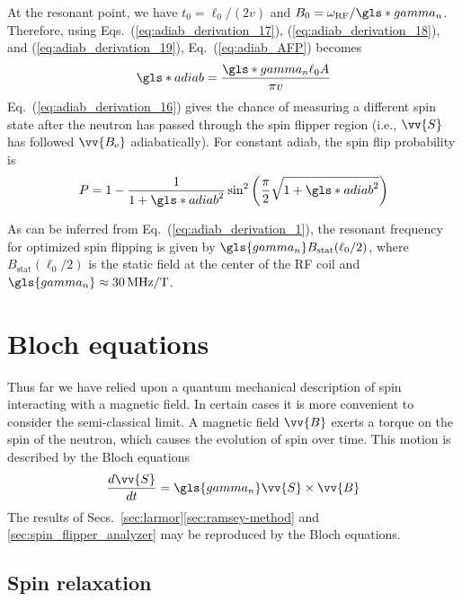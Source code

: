 %
At the resonant point, we have $t_0=\ell_0/(2v)$ and $B_0=\omega_\text{RF}/\gls*{gamma_n}$. Therefore, using Eqs.~(\ref{eq:adiab_derivation_17}), (\ref{eq:adiab_derivation_18}), and (\ref{eq:adiab_derivation_19}), Eq.~(\ref{eq:adiab_AFP}) becomes
%
\begin{gather}
    \gls*{adiab} = \frac{\gls*{gamma_n} \ell_0 A}{\pi v}
\end{gather}
%
Eq.~(\ref{eq:adiab_derivation_16}) gives the chance of measuring a different spin state after the neutron has passed through the spin flipper region (i.e., $\vv{S}$ has followed $\vv{B_\text{e}}$ adiabatically). For constant \gls*{adiab}, the spin flip probability is
%
\begin{gather}
    P=1-\frac{1}{1+\gls*{adiab}^{2}}\sin^{2}\left(\frac{\pi}{2}\sqrt{1+\gls*{adiab}^{2}}\right)
\end{gather}

As can be inferred from Eq.~(\ref{eq:adiab_derivation_1}), the resonant frequency for optimized spin flipping is given by $\gls{gamma_n} B_\text{stat}(\ell_0/2)$, where $B_\text{stat}(\ell_0/2)$ is the static field at the center of the RF coil and $\gls{gamma_n} \approx \qty{30}{MHz \per T}$.


\section{Bloch equations}\label{sec:bloch_equations}


Thus far we have relied upon a quantum mechanical description of spin interacting with a magnetic field. In certain cases it is more convenient to consider the semi-classical limit. A magnetic field $\vv{B}$ exerts a torque on the spin of the neutron, which causes the evolution of spin over time. This motion is described by the Bloch equations
%
\begin{gather}
    \frac{d\vv{S}}{dt}=\gls{gamma_n}\vv{S}\times \vv{B}
    \label{eq:bloch_equations}
\end{gather}
%
The results of Secs.~\ref{sec:larmor}\textendash \ref{sec:ramsey-method} and \ref{sec:spin_flipper_analyzer} may be reproduced by the Bloch equations.


\subsection{Spin relaxation}\label{sec:spin_relaxation}

